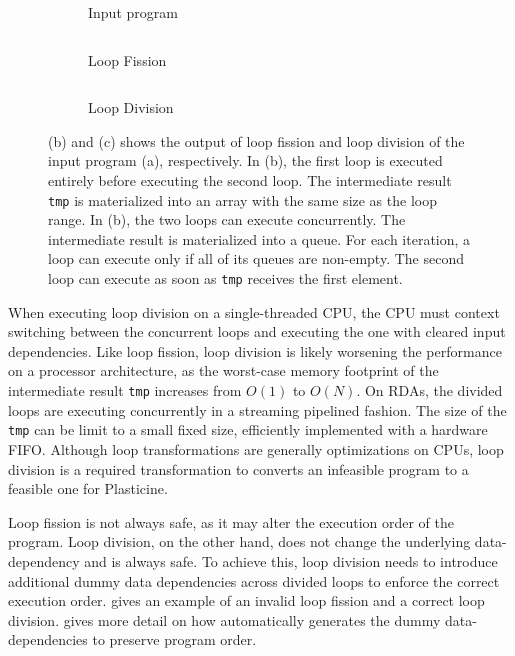 \begin{figure}
\centering
\begin{subfigure}[b]{0.28\textwidth}
\inputminted{python}{code/loopexp1.py}
\caption{Input program}
\end{subfigure}
\hfill
\begin{subfigure}[b]{0.31\textwidth}
\inputminted{python}{code/loopexp1fission.py}
\caption{Loop Fission}
\end{subfigure}
\hfill
\begin{subfigure}[b]{0.32\textwidth}
\inputminted{python}{code/loopexp1division.py}
\caption{Loop Division}
\end{subfigure}
\caption[Example of loop fission vs. loop division]{
  (b) and (c) shows the output of loop fission and loop division of the input program (a), respectively.
  In (b), the first loop is executed entirely before executing the second loop. The intermediate
  result \texttt{tmp} is materialized into an array with the same size as the loop range.
  In (b), the two loops can execute concurrently. The intermediate result is materialized into a
  queue. For each iteration, a loop can execute only if all of its queues are non-empty.
  The second loop can execute as soon as \texttt{tmp} receives the first element.
}
\label{fig:loopexp1}
\end{figure}

When executing loop division on a single-threaded CPU, the CPU must context switching between the
concurrent loops
and executing the one with cleared input dependencies.
Like loop fission, loop division is likely worsening the performance on a processor architecture, as
the worst-case memory footprint of the intermediate result \texttt{tmp} increases from $O(1)$ to $O(N)$.
On RDAs, the divided loops are executing
concurrently in a streaming pipelined fashion. The size of the \texttt{tmp} can be limit to a small fixed
size, efficiently implemented with a hardware FIFO. 
Although loop transformations are generally optimizations on CPUs,
loop division is a required transformation to converts an infeasible program to a feasible one for Plasticine.

Loop fission is not always safe, as it may alter the execution order of the program.
Loop division, on the other hand, does not change the underlying data-dependency and is always safe.
To achieve this, loop division needs to introduce additional dummy data dependencies across divided
loops to enforce the correct execution order.
 gives an example of an invalid loop fission and a correct loop division.
 gives more detail on how \name automatically generates the dummy
data-dependencies to preserve program order.


